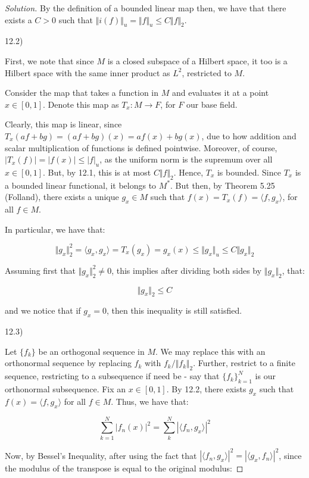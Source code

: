 \documentclass[10pt]{article}
\begin{document}
\begin{proof}[Solution]
By the definition of a bounded linear map then, we have that there exists a $C> 0$ such that $\Vert i(f) \Vert_u = \Vert f \Vert_u \leq C \Vert f \Vert_2$.

12.2)

First, we note that since $M$ is a closed subspace of a Hilbert space, it too is a Hilbert space with the same inner product as $L^2$, restricted to $M$.

Consider the map that takes a function in $M$ and evaluates it at a point $x \in [0,1]$. Denote this map as $T_x: M \to F$, for $F$ our base field.

Clearly, this map is linear, since $T_x(af + bg) = (af + bg)(x) = a f(x) + bg(x)$, due to how addition and scalar multiplication of functions is defined pointwise. Moreover, of course, $|T_x(f)| = | f(x) | \leq |f|_u$, as the uniform norm is the supremum over all $x \in [0,1]$. But, by 12.1, this is at most $C \Vert f \Vert_2$. Hence, $T_x$ is bounded. Since $T_x$ is a bounded linear functional, it belongs to $M^*$. But then, by Theorem 5.25 (Folland), there exists a unique $g_x \in M$ such that $f(x) = T_x(f) = \langle f, g_x \rangle$, for all $f \in M$. 

In particular, we have that:

$$ \Vert g_x \Vert_2^2 = \langle g_x, g_x \rangle = T_x(g_x) = g_x(x) \leq \Vert g_x \Vert_u \leq C \Vert  g_x \Vert_2$$

Assuming first that $\Vert g_x \Vert_2^2 \not = 0$, this implies after dividing both sides by $\Vert g_x \Vert_2$, that:

$$ \Vert g_x \Vert_2 \leq C $$

and we notice that if $g_x = 0$, then this inequality is still satisfied.

12.3)

Let $\{ f_k \}$ be an orthogonal sequence in $M$. We may replace this with an orthonormal sequence by replacing $f_k$ with $f_k/\Vert f_k \Vert_2$. Further, restrict to a finite sequence, restricting to a subsequence if need be - say that $\{ f_k \}_{k=1}^N$ is our orthonormal subsequence. Fix an $x \in [0,1]$. By 12.2, there exists $g_x$ such that $f(x) = \langle f, g_x \rangle$ for all $f \in M$. Thus, we have that:

$$ \sum_{k=1}^N | f_n(x) |^2 = \sum_{k}^N | \langle f_n, g_x \rangle |^2$$

Now, by Bessel's Inequality, after using the fact that $| \langle f_n, g_x \rangle |^2 = | \langle g_x, f_n \rangle |^2$, since the modulus of the transpose is equal to the original modulus:


\end{proof}
\end{document}
